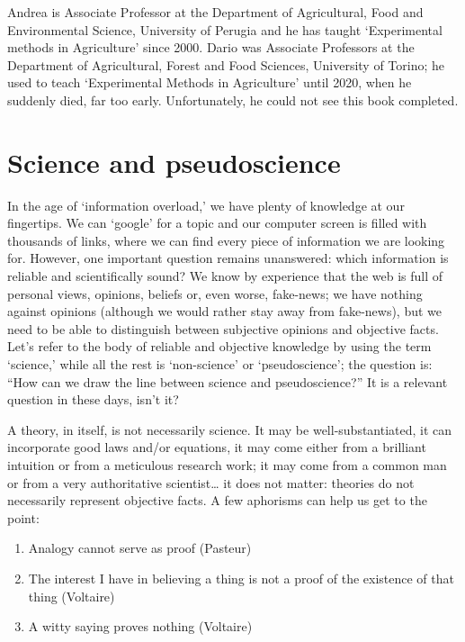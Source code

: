 \documentclass[a4paper,12pt,oneside]{book}
\providecommand{\tightlist}{%
  \setlength{\itemsep}{0pt}\setlength{\parskip}{0pt}}
\begin{document}
Andrea is Associate Professor at the Department of Agricultural, Food and Environmental Science, University of Perugia and he has taught `Experimental methods in Agriculture' since 2000. Dario was Associate Professors at the Department of Agricultural, Forest and Food Sciences, University of Torino; he used to teach `Experimental Methods in Agriculture' until 2020, when he suddenly died, far too early. Unfortunately, he could not see this book completed.

\hypertarget{science-and-pseudoscience}{%
\chapter{Science and pseudoscience}\label{science-and-pseudoscience}}

In the age of `information overload,' we have plenty of knowledge at our fingertips. We can `google' for a topic and our computer screen is filled with thousands of links, where we can find every piece of information we are looking for. However, one important question remains unanswered: which information is reliable and scientifically sound? We know by experience that the web is full of personal views, opinions, beliefs or, even worse, fake-news; we have nothing against opinions (although we would rather stay away from fake-news), but we need to be able to distinguish between subjective opinions and objective facts. Let's refer to the body of reliable and objective knowledge by using the term `science,' while all the rest is `non-science' or `pseudoscience'; the question is: ``How can we draw the line between science and pseudoscience?'' It is a relevant question in these days, isn't it?

A theory, in itself, is not necessarily science. It may be well-substantiated, it can incorporate good laws and/or equations, it may come either from a brilliant intuition or from a meticulous research work; it may come from a common man or from a very authoritative scientist\ldots{} it does not matter: theories do not necessarily represent objective facts. A few aphorisms can help us get to the point:

\begin{enumerate}
\def\labelenumi{\arabic{enumi}.}
\tightlist
\item
  Analogy cannot serve as proof (Pasteur)
\item
  The interest I have in believing a thing is not a proof of the existence of that thing (Voltaire)
\item
  A witty saying proves nothing (Voltaire)
\end{enumerate}
\end{document}
